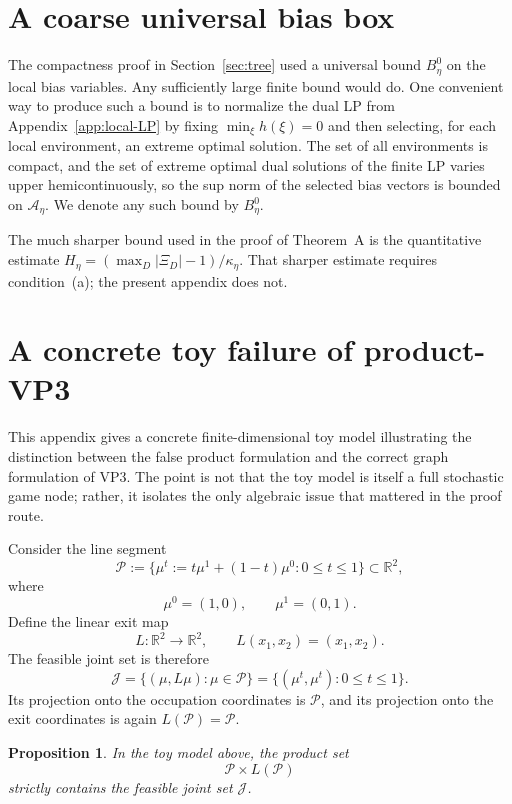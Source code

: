 \documentclass[12pt]{article}
\newtheorem{proposition}[theorem]{Proposition}
\theoremstyle{definition}
\newcommand{\R}{\mathbb{R}}
\newcommand{\1}{\mathbf{1}}
\newcommand{\cA}{\mathcal{A}}
\newcommand{\cP}{\mathcal{P}}
\begin{document}
\section{A coarse universal bias box}
\label{app:bias-box}

The compactness proof in Section~\ref{sec:tree} used a universal bound \(B_\eta^0\) on the
local bias variables.  Any sufficiently large finite bound would do.  One convenient way
to produce such a bound is to normalize the dual LP from Appendix~\ref{app:local-LP} by
fixing \(\min_\xi h(\xi)=0\) and then selecting, for each local environment, an extreme
optimal solution.  The set of all environments is compact, and the set of extreme optimal
dual solutions of the finite LP varies upper hemicontinuously, so the sup norm of the
selected bias vectors is bounded on \(\cA_\eta\).  We denote any such bound by
\(B_\eta^0\).

The much sharper bound used in the proof of Theorem~A is the quantitative estimate
\(H_\eta=(\max_D|\Xi_D|-1)/\kappa_\eta\).  That sharper estimate requires condition~(a); the present
appendix does not.


\section{A concrete toy failure of product-VP3}
\label{app:toy-vp3}

This appendix gives a concrete finite-dimensional toy model illustrating the distinction
between the false product formulation and the correct graph formulation of VP3.  The point
is not that the toy model is itself a full stochastic game node; rather, it isolates the
only algebraic issue that mattered in the proof route.

Consider the line segment
\[
\cP:=
\{\mu^t:=t\mu^1+(1-t)\mu^0:0\le t\le 1\}
\subset \R^2,
\]
where
\[
\mu^0=(1,0),\qquad \mu^1=(0,1).
\]
Define the linear exit map
\[
L:\R^2\to \R^2,\qquad
L(x_1,x_2)=(x_1,x_2).
\]
The feasible joint set is therefore
\[
\mathcal J
=
\{(\mu,L\mu):\mu\in \cP\}
=
\{(\mu^t,\mu^t):0\le t\le 1\}.
\]
Its projection onto the occupation coordinates is \(\cP\), and its projection onto the exit
coordinates is again \(L(\cP)=\cP\).

\begin{proposition}
\label{prop:toy-rectangle}
In the toy model above, the product set
\[
\cP\times L(\cP)
\]
strictly contains the feasible joint set \(\mathcal J\).
\end{proposition}
\end{document}

